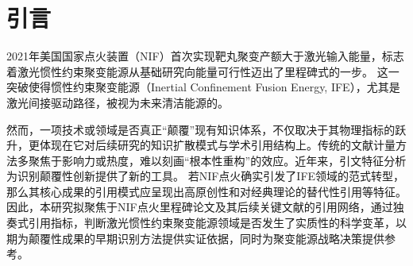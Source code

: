 \documentclass[12pt,hyperref,a4paper,UTF8]{ctexart}
\begin{document}
\cover

\newpage
\begin{abstract}

2021年美国国家点火装置（NIF）首次实现聚变增益（$Q>1$），为激光惯性约束聚变能源（IFE）领域带来了里程碑式突破。本研究基于Scopus数据库构建包含243篇核心文献的三层引文网络，采用Wu与Yan提出的独奏引用（Solo Citations, SC）指标体系，系统分析IFE领域的知识扩散模式与学术引用结构，评估NIF点火是否引发了实质性的科学范式转型。结果表明：IFE领域独奏引用占比自1992年以来整体波动下降，呈现渐进式发展特征而非革命性跃迁；知识产出高度集中于美、中、法三国，体现该领域典型的大科学特征。本研究验证了$R_{\mathrm{SC}}$指标在颠覆性创新评估中的有效性，为聚变能源战略决策提供科学计量学视角的实证参考。

\vspace{1cm}

\textbf{关键词：}惯性约束聚变；独奏式应用；科学计量学；

\end{abstract}

\thispagestyle{empty} %

\newpage
\tableofcontents

\newpage


\section{引言}
2021年美国国家点火装置（NIF）首次实现靶丸聚变产额大于激光输入能量\cite{abu2022lawson}，标志着激光惯性约束聚变能源从基础研究向能量可行性迈出了里程碑式的一步。
这一突破使得惯性约束聚变能源（Inertial Confinement Fusion Energy, IFE），尤其是激光间接驱动路径，被视为未来清洁能源的。

然而，一项技术或领域是否真正“颠覆”现有知识体系，不仅取决于其物理指标的跃升，更体现在它对后续研究的知识扩散模式与学术引用结构上。传统的文献计量方法多聚焦于影响力或热度，难以刻画“根本性重构”的效应。近年来，引文特征分析为识别颠覆性创新提供了新的工具。
若NIF点火确实引发了IFE领域的范式转型，那么其核心成果的引用模式应呈现出高原创性和对经典理论的替代性引用等特征。
因此，本研究拟聚焦于NIF点火里程碑论文及其后续关键文献的引用网络，通过独奏式引用指标\cite{wu2019solo}，判断激光惯性约束聚变能源领域是否发生了实质性的科学变革，以期为颠覆性成果的早期识别方法提供实证依据，同时为聚变能源战略决策提供参考。
\end{document}
